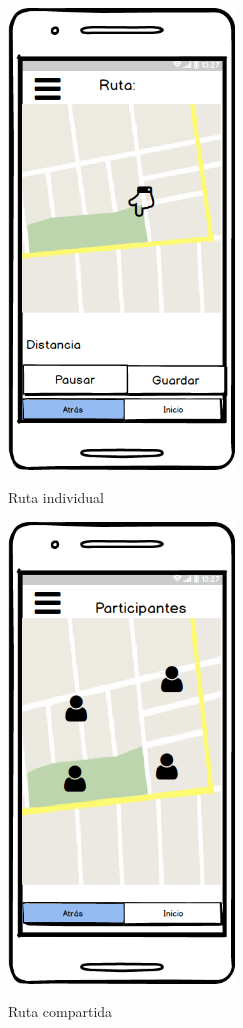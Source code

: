 	\begin{figure}[htbp]
\begin{minipage}[b]{0.5\linewidth} %
\centering
\includegraphics[width=6cm]{maqueta/Trayecto-actual.png}
 \label{figura1}
\caption{Ruta individual}

\end{minipage}
\hspace{0.5cm} %
\begin{minipage}[b]{0.5\linewidth}
\centering
\includegraphics[width=6cm]{maqueta/Trayecto-actual-compartido.png}
 \label{figura2}
\caption{Ruta compartida}

\end{minipage}
\end{figure}



